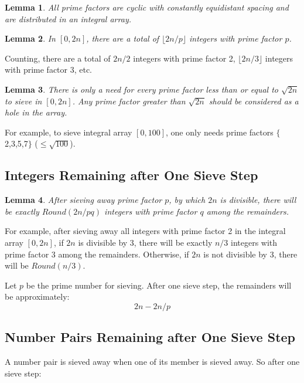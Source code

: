 \documentclass[twocolumn]{article}%
\newtheorem{lem}{Lemma}
\theoremstyle{definition}
\theoremstyle{remark}
\begin{document}
\begin{lem}\label{lemDistribute}
All prime factors are cyclic with constantly equidistant spacing and are distributed in an integral array.
\end{lem}

\begin{lem}
	In \([0,2n]\), there are a total of \(\lfloor2n/p\rfloor\) integers with prime factor $p$.
\end{lem}

Counting, there are a total of \(2n/2\) integers with prime factor 2,
\(\lfloor2n/3\rfloor\) integers with prime factor 3, etc.

\begin{lem}\label{lemHole}
There is only a need for every prime factor less than or equal to \(\sqrt{2n}\) to sieve in $[0, 2n]$. Any prime factor greater than \(\sqrt{2n}\) should be considered as a hole in the array.
\end{lem}

For example, to sieve integral array $[0, 100]$, one only needs prime factors $\{$2,3,5,7$\}$ ($\le\sqrt{100}$).
\subsection*{Integers Remaining after One Sieve Step}

\begin{lem}
	After sieving away prime factor $p$, by which $2n$ is divisible, there will be exactly $Round(2n/pq)$ integers with prime factor $q$ among the remainders.
\end{lem}

For example, after sieving away all integers with prime factor 2 in the integral array $[0, 2n]$, if $2n$ is divisible by 3, there will be exactly $n/3$ integers with prime factor 3 among the remainders. Otherwise, if $2n$ is not divisible by 3, there will be $Round(n/3)$.

\noindent
Let $p$ be the prime number for sieving. After one sieve step, the remainders will be approximately:
\begin{equation}\label{1}
2n - 2n/p
\end{equation}

\subsection*{Number Pairs Remaining after One Sieve Step}

A number pair is sieved away when one of its member is sieved away. So after one sieve step:
\end{document}
